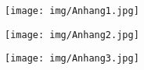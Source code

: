 \begin{figure*}
    \centering
    \texttt{[image: img/Anhang1.jpg]}
\end{figure*}
\begin{figure*}
    \centering
    \texttt{[image: img/Anhang2.jpg]}
\end{figure*}
\begin{figure*}
    \centering
    \texttt{[image: img/Anhang3.jpg]}
\end{figure*}